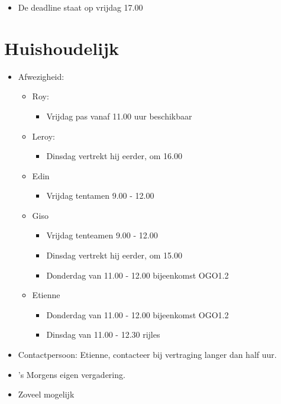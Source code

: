 \documentclass[]{article}
\begin{document}
\begin{itemize}
   \item De deadline staat op vrijdag 17.00
\end{itemize}





\section{Huishoudelijk}
\begin{itemize}
   \item Afwezigheid:
    \begin{itemize}
      \item Roy:
        \begin{itemize}
          \item Vrijdag pas vanaf 11.00 uur beschikbaar
        \end{itemize}
      \item Leroy:
        \begin{itemize}
          \item Dinsdag vertrekt hij eerder, om 16.00
        \end{itemize}
      \item Edin
        \begin{itemize}
          \item Vrijdag tentamen 9.00 - 12.00
        \end{itemize}
      \item Giso
        \begin{itemize}
          \item Vrijdag tenteamen 9.00 - 12.00
          \item Dinsdag vertrekt hij eerder, om 15.00
          \item Donderdag van 11.00 - 12.00 bijeenkomst OGO1.2
        \end{itemize}
      \item Etienne
        \begin{itemize}
          \item Donderdag van 11.00 - 12.00 bijeenkomst OGO1.2
          \item Dinsdag van 11.00 - 12.30 rijles
        \end{itemize}
    \end{itemize}
    \item Contactpersoon: Etienne, contacteer bij vertraging langer dan half uur.
    \item 's Morgens eigen vergadering.
    \item Zoveel mogelijk
\end{itemize}
\end{document}
